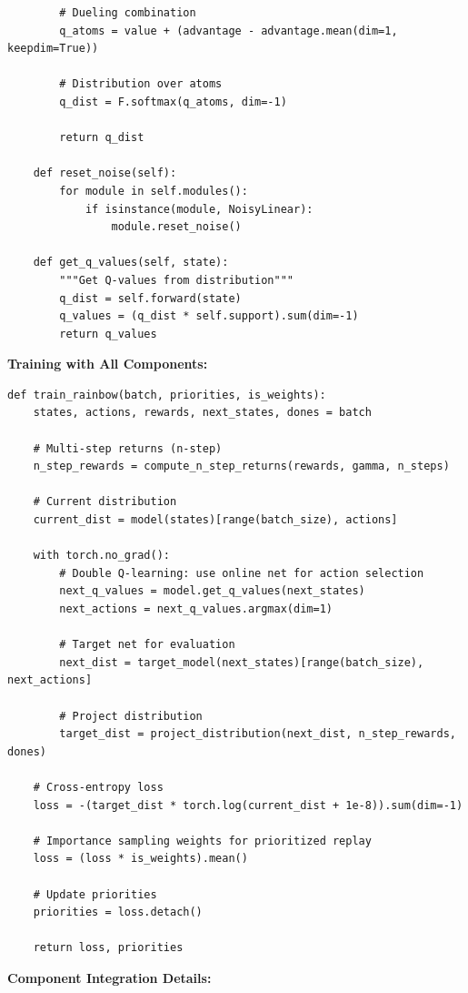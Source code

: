 \documentclass[12pt]{article}
\begin{document}
{{\begin{verbatim}
        # Dueling combination
        q_atoms = value + (advantage - advantage.mean(dim=1, keepdim=True))

        # Distribution over atoms
        q_dist = F.softmax(q_atoms, dim=-1)

        return q_dist

    def reset_noise(self):
        for module in self.modules():
            if isinstance(module, NoisyLinear):
                module.reset_noise()

    def get_q_values(self, state):
        """Get Q-values from distribution"""
        q_dist = self.forward(state)
        q_values = (q_dist * self.support).sum(dim=-1)
        return q_values
\end{verbatim}

\textbf{Training with All Components:}

\begin{verbatim}
def train_rainbow(batch, priorities, is_weights):
    states, actions, rewards, next_states, dones = batch
    
    # Multi-step returns (n-step)
    n_step_rewards = compute_n_step_returns(rewards, gamma, n_steps)
    
    # Current distribution
    current_dist = model(states)[range(batch_size), actions]
    
    with torch.no_grad():
        # Double Q-learning: use online net for action selection
        next_q_values = model.get_q_values(next_states)
        next_actions = next_q_values.argmax(dim=1)
        
        # Target net for evaluation
        next_dist = target_model(next_states)[range(batch_size), next_actions]
        
        # Project distribution
        target_dist = project_distribution(next_dist, n_step_rewards, dones)
    
    # Cross-entropy loss
    loss = -(target_dist * torch.log(current_dist + 1e-8)).sum(dim=-1)
    
    # Importance sampling weights for prioritized replay
    loss = (loss * is_weights).mean()
    
    # Update priorities
    priorities = loss.detach()
    
    return loss, priorities
\end{verbatim}

\textbf{Component Integration Details:}

}}
\end{document}
